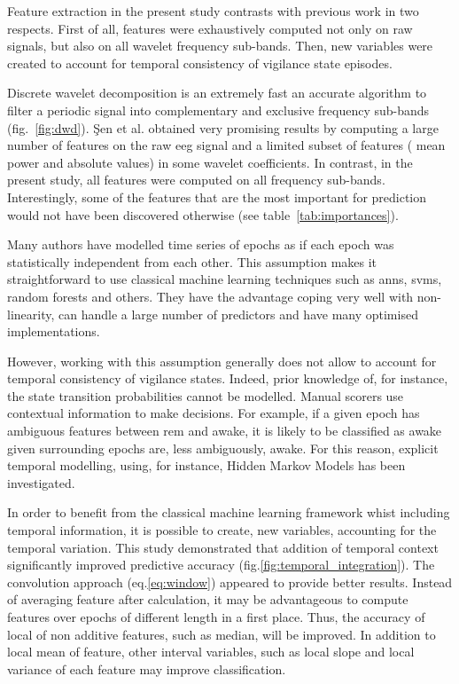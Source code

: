 Feature extraction in the present study contrasts with previous work in two respects.
First of all, features were exhaustively computed not only on raw signals,
but also on all wavelet frequency sub-bands.
Then, new variables were created to account for temporal consistency of vigilance state episodes.

Discrete wavelet decomposition is an extremely fast an accurate algorithm to filter a periodic
signal into complementary and exclusive frequency sub-bands (fig.~\ref{fig:dwd}).
\c{S}en et al.\cite{sen_comparative_2014} obtained very promising results by
computing a large number of features on the raw \gls{eeg} signal and a limited subset of features (\ie{} mean power and absolute values) in some wavelet coefficients.
In contrast, in the present study, all features were computed on all frequency sub-bands.
Interestingly, some of the features that are the most important for prediction would not have
been discovered otherwise (see table~\ref{tab:importances}).



Many authors have modelled time series of epochs as if each epoch was statistically independent from each other.
This assumption makes it straightforward to use classical machine learning techniques such as
\glspl{ann}, \glspl{svm}\cite{crisler_sleep-stage_2008},
random forests\cite{breiman_random_2001} and others.
They have the advantage coping very well with non-linearity, can handle a large number of predictors and have many optimised implementations.

However, working with this assumption generally does not allow to account for temporal consistency of vigilance states.
Indeed, prior knowledge of, for instance, the state transition probabilities cannot be modelled.
Manual scorers use contextual information to make decisions.
For example, if a given epoch has ambiguous features between \gls{rem} and awake,
it is likely to be classified as awake given surrounding epochs are, less ambiguously, awake.
For this reason, explicit temporal modelling, using, for instance, Hidden Markov Models has been investigated\cite{doroshenkov_classification_2007,pan_transition-constrained_2012}.

In order to benefit from the classical machine learning
framework whist including temporal information,
it is possible to create, new variables, accounting for the temporal
variation\cite{dietterich_machine_2002}.
This study demonstrated that addition of temporal context significantly improved predictive accuracy (fig.\ref{fig:temporal_integration}).
The convolution approach (eq.\ref{eq:window}) appeared to provide better results.
Instead of averaging feature after calculation, it may be advantageous to compute features over epochs of different length in a first place.
Thus, the accuracy of local of non additive features, such as median, will be improved. In addition to local mean of feature, other interval variables, such as local
slope and local variance of each feature may improve
classification\cite{rodriguez_support_2005,deng_time_2013}.

